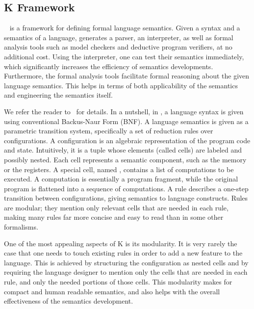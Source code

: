 \subsection{K Framework}\label{sec:KF}

\K~\cite{k-primer-2013-v32}  is a framework for
defining formal language semantics. Given a syntax and a semantics of a language, \K
generates a parser, an interpreter, as well as formal analysis tools such as
model checkers and deductive program verifiers, at no additional cost. Using
the interpreter, one can test their semantics immediately, which significantly
increases the efficiency of semantics developments. Furthermore, the formal
analysis tools facilitate formal reasoning about the given language semantics.
This helps in terms of both applicability of the semantics and
engineering the semantics itself.

We   refer the reader to~\cite{k-primer-2013-v32, rosu-serbanuta-2010-jlap} for
 details. In a nutshell, in \K, a language syntax is given using conventional
Backus-Naur Form (BNF). A language semantics is given as a parametric
transition system, specifically a set of reduction rules over configurations. A configuration is an algebraic representation of the
program code and state. Intuitively, it is a tuple whose elements
(called cells) are labeled and possibly nested. Each cell represents a
semantic component, such as the memory or the registers. A special cell, named , contains a
list of computations to be executed. A computation is essentially
a program fragment, while the original program is flattened into a
sequence of computations. A rule describes a one-step transition
between configurations, giving semantics to language
constructs. Rules are modular; they mention only relevant cells that
are needed in each rule, making many rules far more concise and easy to read
than in some other formalisms.



One of the most appealing aspects of K is its modularity. It is very rarely the
case that one needs to touch existing rules in order to add a new feature to
the language. This is achieved by structuring the configuration as nested cells
and by requiring the language designer to mention only the cells that are
needed in each rule, and only the needed portions of those cells. 
This modularity makes for compact and human readable semantics, and also helps 
with the overall effectiveness of the semantics development. 

% 
